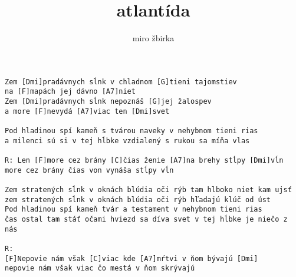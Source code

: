 \author{miro žbirka}
\title{atlantída}
\maketitle
\begin{verbatim}
Zem [Dmi]pradávnych sĺnk v chladnom [G]tieni tajomstiev
na [F]mapách jej dávno [A7]niet
Zem [Dmi]pradávnych sĺnk nepoznáš [G]jej žalospev
a more [F]nevydá [A7]viac ten [Dmi]svet

Pod hladinou spí kameň s tvárou naveky v nehybnom tieni rias
a milenci sú si v tej hĺbke vzdialený s rukou sa míňa vlas

R: Len [F]more cez brány [C]čias ženie [A7]na brehy stĺpy [Dmi]vĺn
more cez brány čias von vynáša stĺpy vĺn

Zem stratených sĺnk v oknách blúdia oči rýb tam hlboko niet kam ujsť
zem stratených sĺnk v oknách blúdia oči rýb hľadajú klúč od úst
Pod hladinou spí kameň tvár a testament v nehybnom tieni rias
čas ostal tam stáť očami hviezd sa díva svet v tej hĺbke je niečo z nás

R:
[F]Nepovie nám však [C]viac kde [A7]mŕtvi v ňom bývajú [Dmi]
nepovie nám však viac čo mestá v ňom skrývajú

\end{verbatim}